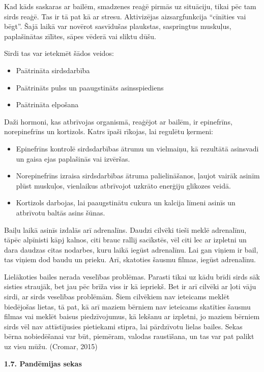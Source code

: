 \documentclass[12pt]{article}
\begin{document}
Kad kāds saskaras ar bailēm, smadzenes reaģē pirmās uz situāciju, tikai pēc tam sirds reaģē. Tas ir tā pat kā ar stresu. Aktivizējas aizsargfunkcija “cīnīties vai bēgt”.  Šajā laikā var novērot sasvīdušas plaukstas, saspringtus muskuļus, paplašinātas zīlītes, sāpes vēderā vai sliktu dūšu. \par
Sirdi tas var ietekmēt šādos veidos:
\begin{itemize}
\setlength\itemsep{0em}
  \item Paātrināta sirdsdarbība
  \item Paātrināts pulss un paaugstināts asinsspiediens
  \item Paātrināta elpošana
\end{itemize}
Daži hormoni, kas atbrīvojas organismā, reaģējot ar bailēm, ir epinefrīns, norepinefrīns un kortizols. Katrs īpaši rīkojas, lai regulētu ķermeni:
\begin{itemize}
\setlength\itemsep{0em}
  \item Epinefrīns kontrolē sirdsdarbības ātrumu un vielmaiņu, kā rezultātā asinsvadi un gaisa ejas paplašinās vai izvēršas.
  \item Norepinefrīns izraisa sirdsdarbības ātruma palielināšanos, ļaujot vairāk asinīm plūst muskuļos, vienlaikus atbrīvojot uzkrāto enerģiju glikozes veidā. 
  \item Kortizols darbojas, lai paaugstinātu cukura un kalcija līmeni asinīs un atbrīvotu baltās asins šūnas.
\end{itemize}


Baiļu laikā asinīs izdalās arī adrenalīns. Daudzi cilvēki tieši meklē adrenalīnu, tāpēc alpīnisti kāpj kalnos, citi brauc rallij sacīkstēs, vēl citi lec ar izpletni un dara daudzas citas nodarbes, kuru laikā iegūst adrenalīnu. Lai gan viņiem ir bail, tas viņiem dod baudu un prieku. Arī, skatoties šausmu filmas, iegūst adrenalīnu. \par
Lielākoties bailes nerada veselības problēmas. Parasti tikai uz kādu brīdi sirds sāk sisties straujāk, bet jau pēc brīža viss ir kā iepriekš. Bet ir arī cilvēki ar ļoti vāju sirdi, ar sirds veselības problēmām. Šiem cilvēkiem nav ieteicams meklēt biedējošas lietas, tā pat, kā arī maziem bērniem nav ieteicams skatīties šausmu filmas vai meklēt baisus piedzīvojumus, kā lekšanu ar izpletni, jo maziem bērniem sirds vēl nav attīstījusies pietiekami stipra, lai pārdzīvotu lielas bailes. Sekas bērna nobiedēšanai var būt, piemēram, valodas raustīšana, un tas var pat palikt uz visu mūžu. (Cromar, 2015)

\begin{center}
\fontsize{14}{}\selectfont\textbf{1.7. Pandēmijas sekas}
\end{center}
\end{document}
